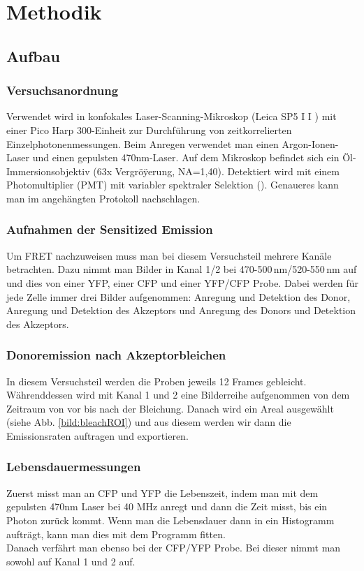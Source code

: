 
\chapter{Methodik}

\section{Aufbau}

\subsection{Versuchsanordnung}

Verwendet wird in konfokales Laser-Scanning-Mikroskop (Leica SP5 I I ) mit einer Pico Harp
300-Einheit zur Durchführung von zeitkorrelierten Einzelphotonenmessungen. Beim Anregen verwendet man einen Argon-Ionen-Laser 
und einen gepulsten 470nm-Laser. Auf dem Mikroskop befindet sich ein Öl-Immersionsobjektiv (63x Vergröÿerung, NA=1,40). Detektiert wird 
mit einem Photomultiplier (PMT) mit variabler spektraler Selektion (\cite{FRETSkript}). 
Genaueres kann man im angehängten Protokoll nachschlagen.

\subsection{Aufnahmen der Sensitized Emission}

Um FRET nachzuweisen muss man bei diesem Versuchsteil mehrere Kanäle betrachten. Dazu nimmt man Bilder in Kanal 1/2 
bei 470-500\,nm/520-550\,nm auf und dies von einer YFP, einer CFP und einer YFP/CFP Probe. Dabei werden für jede Zelle immer drei Bilder 
aufgenommen: Anregung und Detektion des Donor, Anregung und Detektion des Akzeptors und Anregung des Donors und Detektion des Akzeptors.


\subsection{Donoremission nach Akzeptorbleichen}

In diesem Versuchsteil werden die Proben jeweils 12 Frames gebleicht. Währenddessen wird mit Kanal 1 und 2 eine Bilderreihe 
aufgenommen von dem Zeitraum von vor bis nach der Bleichung. Danach wird ein Areal ausgewählt (siehe Abb. \ref{bild:bleachROI}) und aus 
diesem werden wir dann die Emissionsraten auftragen und exportieren. 

\subsection{Lebensdauermessungen}

Zuerst misst man an CFP und YFP die Lebenszeit, indem man mit dem gepulsten 470nm Laser bei 40 MHz anregt und dann die Zeit misst, bis ein Photon zurück kommt. 
Wenn man die Lebensdauer dann in ein Histogramm aufträgt, kann man dies mit dem Programm fitten.\\
Danach verfährt man ebenso bei der CFP/YFP Probe. Bei dieser nimmt man sowohl auf Kanal 1 und 2 auf.